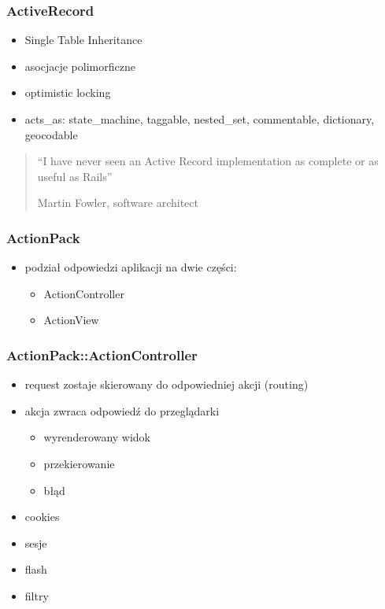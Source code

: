 \documentclass[12t]{beamer}
\begin{document}
\begin{frame}
  \frametitle{ActiveRecord}
  \begin{itemize}
  \item Single Table Inheritance
  \item asocjacje polimorficzne
  \item optimistic locking
  \item acts\_as: state\_machine, taggable, nested\_set, commentable,
    dictionary, geocodable
  \end{itemize}
\end{frame}

\begin{frame}
  \begin{quote}
    “I have never seen an Active Record implementation as complete or as useful as Rails”

    \begin{small}
      \hfill Martin Fowler, software architect
    \end{small}
  \end{quote}
\end{frame}

\begin{frame}
  \frametitle{ActionPack}
  \begin{itemize}
  \item podział odpowiedzi aplikacji na dwie części:
    \begin{itemize}
    \item ActionController
    \item ActionView
    \end{itemize}
  \end{itemize}
\end{frame}

\begin{frame}
  \frametitle{ActionPack::ActionController}
  \begin{itemize}
  \item request zostaje skierowany do odpowiedniej akcji (routing)
  \item akcja zwraca odpowiedź do przeglądarki
    \begin{itemize}
    \item wyrenderowany widok
    \item przekierowanie
    \item błąd
    \end{itemize}
  \item cookies
  \item sesje
  \item flash
  \item filtry
  \end{itemize}
\end{frame}
\end{document}
